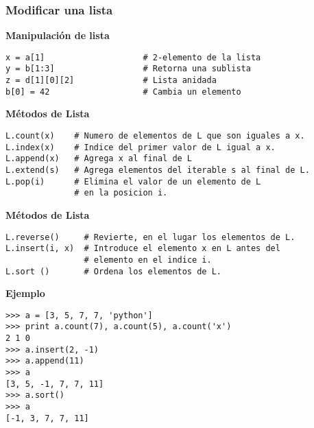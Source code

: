 \documentclass[10pt]{beamer}
\begin{document}
\begin{frame}[fragile]
\frametitle{Modificar una lista}


\vspace{0.2cm}

\textbf{Manipulaci\'on de lista}

\vspace{0.2cm}

\begin{lstlisting}
x = a[1]                    # 2-elemento de la lista
y = b[1:3]                  # Retorna una sublista
z = d[1][0][2]              # Lista anidada
b[0] = 42                   # Cambia un elemento
\end{lstlisting}

\vspace{0.2cm}

\textbf{M\'etodos de Lista}

\vspace{0.2cm}

\begin{lstlisting}
L.count(x)    # Numero de elementos de L que son iguales a x.
L.index(x)    # Indice del primer valor de L igual a x.
L.append(x)   # Agrega x al final de L
L.extend(s)   # Agrega elementos del iterable s al final de L.
L.pop(i)      # Elimina el valor de un elemento de L 
              # en la posicion i. 
\end{lstlisting}
\end{frame}

\begin{frame}[fragile]

\vspace{0.2cm}

\textbf{M\'etodos de Lista}

\vspace{0.2cm}

\begin{lstlisting}
L.reverse()     # Revierte, en el lugar los elementos de L.
L.insert(i, x)  # Introduce el elemento x en L antes del
                # elemento en el indice i.
L.sort ()       # Ordena los elementos de L.
\end{lstlisting}


\vspace{0.2cm}

\textbf{Ejemplo}

\vspace{0.2cm}


\begin{lstlisting}
>>> a = [3, 5, 7, 7, 'python']
>>> print a.count(7), a.count(5), a.count('x')
2 1 0
>>> a.insert(2, -1)
>>> a.append(11)
>>> a
[3, 5, -1, 7, 7, 11]
>>> a.sort()
>>> a
[-1, 3, 7, 7, 11]
\end{lstlisting}

\end{frame}
\end{document}
